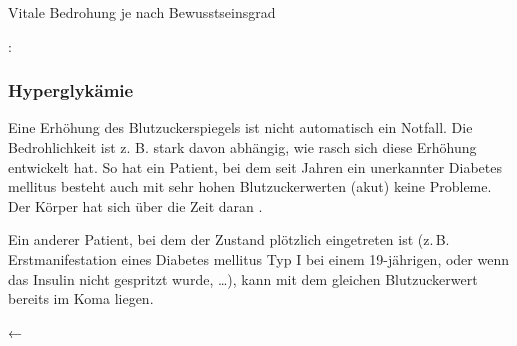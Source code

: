 {Vitale
Bedrohung je nach Bewusstseinsgrad

: 
}{}
% 
%   
%   

\subsubsection{Hyperglykämie}
\label{topic:hyperglykaemie}



{%
Eine Erhöhung des Blutzuckerspiegels ist nicht automatisch
ein Notfall. Die Bedrohlichkeit ist z. B. stark davon
abhängig, wie rasch sich diese Erhöhung entwickelt hat. So
hat ein Patient, bei dem seit Jahren ein unerkannter
Diabetes mellitus besteht auch mit sehr hohen
Blutzuckerwerten (akut) keine Probleme. Der Körper hat sich
über die Zeit daran .

Ein anderer Patient, bei dem der Zustand plötzlich
eingetreten ist (z.\,B. Erstmanifestation eines Diabetes
mellitus Typ I bei einem 19-jährigen, oder wenn das Insulin
nicht gespritzt wurde, \ldots), kann mit dem gleichen
Blutzuckerwert bereits im Koma liegen.

 }
{←}
{}{}{}



